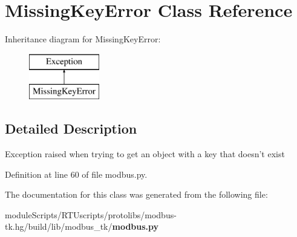 \section{Missing\+Key\+Error Class Reference}
\label{classmodbus__tk_1_1modbus_1_1_missing_key_error}
Inheritance diagram for Missing\+Key\+Error\+:\begin{figure}[H]
\begin{center}
\leavevmode
\includegraphics[height=2.000000cm]{classmodbus__tk_1_1modbus_1_1_missing_key_error}
\end{center}
\end{figure}


\subsection{Detailed Description}
\begin{DoxyVerb}Exception raised when trying to get an object with a key that doesn't exist
\end{DoxyVerb}
 

Definition at line 60 of file modbus.\+py.



The documentation for this class was generated from the following file\+:\begin{DoxyCompactItemize}
\item 
module\+Scripts/\+R\+T\+Uscripts/protolibs/modbus-\/tk.\+hg/build/lib/modbus\+\_\+tk/{\bf modbus.\+py}\end{DoxyCompactItemize}
